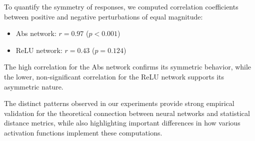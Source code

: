 To quantify the symmetry of responses, we computed correlation coefficients between positive and negative perturbations of equal magnitude:

\begin{itemize}
    \item Abs network: $r = 0.97$ ($p < 0.001$)
    \item ReLU network: $r = 0.43$ ($p = 0.124$)
\end{itemize}

The high correlation for the Abs network confirms its symmetric behavior, while the lower, non-significant correlation for the ReLU network supports its asymmetric nature.

The distinct patterns observed in our experiments provide strong empirical validation for the theoretical connection between neural networks and statistical distance metrics, while also highlighting important differences in how various activation functions implement these computations.